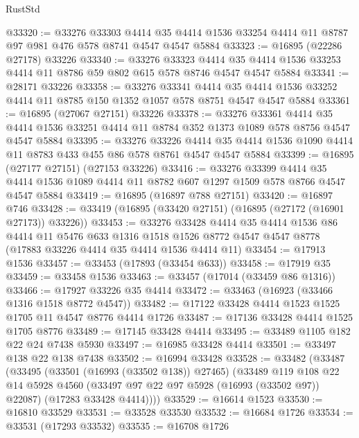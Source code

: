 \begin{lexlean}{RustStd}
\begin{coremodule}
{\begin{coremodule}
{{{{{{{{{{{{{{{{{{{{{{{{{{{{{{{{{{{{{{{{{{{{{{{{{{{{{{{@33320 := @33276
    @33303
    @4414
    @35
    @4414
    @1536
    @33254
    @4414
    @11
    @8787
    @97
    @981
    @476
    @578
    @8741
    @4547
    @4547
    @5884
@33323 := @16895 (@22286 @27178) @33226
@33340 := @33276
    @33323
    @4414
    @35
    @4414
    @1536
    @33253
    @4414
    @11
    @8786
    @59
    @802
    @615
    @578
    @8746
    @4547
    @4547
    @5884
@33341 := @28171 @33226
@33358 := @33276
    @33341
    @4414
    @35
    @4414
    @1536
    @33252
    @4414
    @11
    @8785
    @150
    @1352
    @1057
    @578
    @8751
    @4547
    @4547
    @5884
@33361 := @16895 (@27067 @27151) @33226
@33378 := @33276
    @33361
    @4414
    @35
    @4414
    @1536
    @33251
    @4414
    @11
    @8784
    @352
    @1373
    @1089
    @578
    @8756
    @4547
    @4547
    @5884
@33395 := @33276
    @33226
    @4414
    @35
    @4414
    @1536
    @1090
    @4414
    @11
    @8783
    @433
    @455
    @86
    @578
    @8761
    @4547
    @4547
    @5884
@33399 := @16895 (@27177 @27151) (@27153 @33226)
@33416 := @33276
    @33399
    @4414
    @35
    @4414
    @1536
    @1089
    @4414
    @11
    @8782
    @607
    @1297
    @1509
    @578
    @8766
    @4547
    @4547
    @5884
@33419 := @16895 (@16897 @788 @27151)
@33420 := @16897 @746
@33428 := @33419 (@16895 (@33420 @27151) (@16895 (@27172 (@16901 @27173)) @33226))
@33453 := @33276
    @33428
    @4414
    @35
    @4414
    @1536
    @86
    @4414
    @11
    @5476
    @633
    @1316
    @1518
    @1526
    @8772
    @4547
    @4547
    @8778
    (@17883 @33226 @4414 @35 @4414 @1536 @4414 @11)
@33454 := @17913 @1536
@33457 := @33453 (@17893 (@33454 @633))
@33458 := @17919 @35
@33459 := @33458 @1536
@33463 := @33457 (@17014 (@33459 @86 @1316))
@33466 := @17927 @33226 @35 @4414
@33472 := @33463 (@16923 (@33466 @1316 @1518 @8772 @4547))
@33482 := @17122 @33428 @4414 @1523 @1525 @1705 @11 @4547 @8776 @4414 @1726
@33487 := @17136 @33428 @4414 @1525 @1705 @8776
@33489 := @17145 @33428 @4414
@33495 := @33489 @1105 @182 @22 @24 @7438 @5930
@33497 := @16985 @33428 @4414
@33501 := @33497 @138 @22 @138 @7438
@33502 := @16994 @33428
@33528 := @33482
    (@33487
      (@33495
        (@33501 (@16993 (@33502 @138)) @27465)
        (@33489
          @119
          @108
          @22
          @14
          @5928
          @4560
          (@33497 @97 @22 @97 @5928 (@16993 (@33502 @97)) @22087)
          (@17283 @33428 @4414))))
@33529 := @16614 @1523
@33530 := @16810 @33529
@33531 := @33528 @33530
@33532 := @16684 @1726
@33534 := @33531 (@17293 @33532)
@33535 := @16708 @1726
}}}}}}}}}}}}}}}}}}}}}}}}}}}}}}}}}}}}}}}}}}}}}}}}}}}}}}}
\end{coremodule}}
\end{coremodule}
\end{lexlean}
